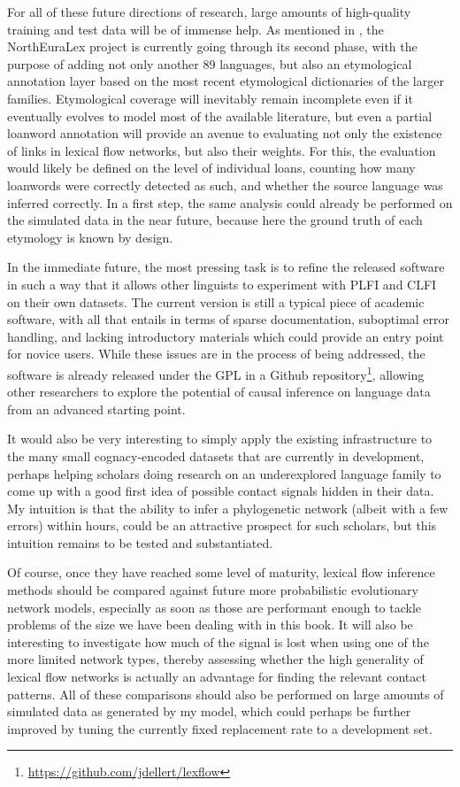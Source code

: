 For all of these future directions of research, large amounts of high-quality training and test data will be of immense help. As mentioned in , the NorthEuraLex project is currently going through its second phase, with the purpose of adding not only another 89 languages, but also an etymological annotation layer based on the most recent etymological dictionaries of the larger families. Etymological coverage will inevitably remain incomplete even if it eventually evolves to model most of the available literature, but even a partial loanword annotation will provide an avenue to evaluating not only the existence of links in lexical flow networks, but also their weights. For this, the evaluation would likely be defined on the level of individual loans, counting how many loanwords were correctly detected as such, and whether the source language was inferred correctly. In a first step, the same analysis could already be performed on the simulated data in the near future, because here the ground truth of 
each etymology is known by design.

In the immediate future, the most pressing task is to refine the released software in such a way that it allows other linguists to experiment with PLFI and CLFI on their own datasets. The current version is still a typical piece of academic software, with all that entails in terms of sparse documentation, suboptimal error handling, and lacking introductory materials which could provide an entry point for novice users. While these issues are in the process of being addressed, the software is already released under the GPL in a Github repository\footnote{\url{https://github.com/jdellert/lexflow}}, allowing other researchers to explore the potential of causal inference on language data from an advanced starting point.

It would also be very interesting to simply apply the existing infrastructure to the many small cognacy-encoded datasets that are currently in development, perhaps helping scholars doing research on an underexplored language family to come up with a good first idea of possible contact signals hidden in their data. My intuition is that the ability to infer a phylogenetic network (albeit with a few errors) within hours, could be an attractive prospect for such scholars, but this intuition remains to be tested and substantiated.

Of course, once they have reached some level of maturity, lexical flow inference methods should be compared against future more probabilistic evolutionary network models, especially as soon as those are performant enough to tackle problems of the size we have been dealing with in this book. It will also be interesting to investigate how much of the signal is lost when using one of the more limited network types, thereby assessing whether the high generality of lexical flow networks is actually an advantage for finding the relevant contact patterns. All of these comparisons should also be performed on large amounts of simulated data as generated by my model, which could perhaps be further improved by tuning the currently fixed replacement rate to a development set.

